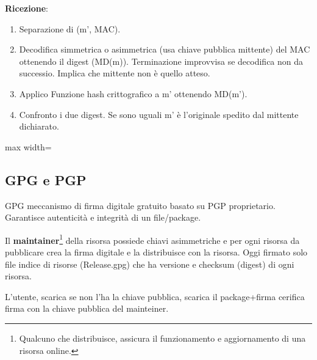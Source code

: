 \textbf{Ricezione}:
\begin{enumerate}
	\item Separazione di (m', MAC).
	\item Decodifica simmetrica o asimmetrica (usa chiave pubblica mittente) del MAC ottenendo il digest (MD(m)).
	Terminazione improvvisa se decodifica non da successio. Implica che mittente non è quello atteso.
	\item Applico Funzione hash crittografico a m' ottenendo MD(m').
	\item Confronto i due digest. Se sono uguali m' è l'originale spedito dal mittente dichiarato.
\end{enumerate}

\begin{center}
	\begin{adjustbox}{max width=\textwidth}
	\end{adjustbox}
\end{center}

\subsection{GPG e PGP}
GPG meccanismo di firma digitale gratuito basato su PGP proprietario. Garantisce autenticità e integrità di un file/package.

\bigskip

Il \textbf{maintainer}\footnote{Qualcuno che distribuisce, assicura il funzionamento e aggiornamento di una risorsa online.} della risorsa possiede chiavi asimmetriche e per ogni risorsa da pubblicare crea la firma digitale e la distribuisce  con la risorsa.
Oggi firmato solo file indice di risorse  (Release.gpg) che ha versione e checksum (digest) di ogni risorsa.

L'utente, scarica se non l'ha la chiave pubblica, scarica il package+firma cerifica firma con la chiave pubblica del mainteiner.

